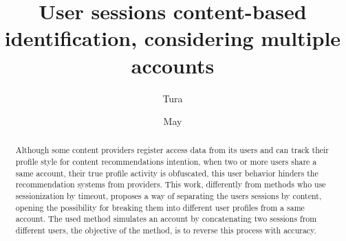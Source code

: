 \documentclass[ecp,tc,english]{iiufrgs}
\title{User sessions content-based identification, considering multiple accounts}
\author{Tura}{Matheus Toazza}
\date{May}{2021}
\begin{document}
\maketitle




\begin{abstract}
  Although some content providers register access data from its users and can track their profile style for content recommendations intention, when two or more users share a same account, their true profile activity is obfuscated, this user behavior hinders the recommendation systems from providers. This work, differently from methods who use sessionization by timeout, proposes a way of separating the users sessions by content, opening the possibility for breaking them into different user profiles from a same account. The used method simulates an account by concatenating two sessions from different users, the objective of the method, is to reverse this process with accuracy.
\end{abstract}
\end{document}
